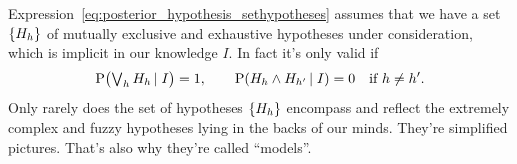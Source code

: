 \documentclass[\ifafour a4paper,12pt,\else a5paper,10pt,\fi%
onecolumn,oneside,article,%
british%
]{memoir}
\theoremstyle{remark}
\theoremstyle{innote}
\newcommand*{\citep}{\footcites}
\newcommand*{\citey}{\footcites}%
\DeclarePairedDelimiter\set{\{}{\}}
\newcommand*{\p}{\mathrm{P}}%
\renewcommand*{\|}[1][]{\nonscript\,#1\vert\nonscript\;\mathopen{}}
\newcommand*{\sect}{\S}%
\newcommand*{\sects}{\S\S}%
\newcommand*{\tlor}{\mathop{\textstyle\bigvee}\nolimits}
\newcommand*{\yK}{I}
\begin{document}


Expression~\eqref{eq:posterior_hypothesis_sethypotheses} assumes that we
have a set $\set{H_{h}}$ of mutually exclusive and exhaustive hypotheses
under consideration, which is implicit in our knowledge $\yK$. In fact it's
only valid if
\begin{equation}
  \label{eq:implicit_knowledge}
  \p\bigl(\tlor_{h} H_{h} \| \yK\bigr) = 1,
  \qquad
  \p(H_{h} \land H_{h'} \| \yK) = 0 \quad \text{if $h \ne h'$}.
\end{equation}\pagebreak
Only  rarely does the set of hypotheses $\set{H_{h}}$
encompass and reflect the extremely complex and fuzzy hypotheses lying in
the backs of our minds. They're simplified pictures. That's also why
they're %
called \enquote{models}.

\end{document}

